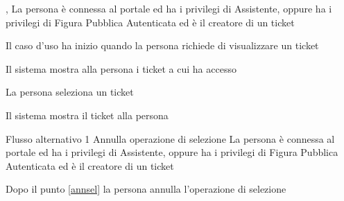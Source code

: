 \tabcuvspace

{, }
{La persona è connessa al portale ed ha i privilegi di Assistente, oppure ha i privilegi di Figura Pubblica Autenticata ed è il creatore di un ticket}
{\postNulle}
{\begin{enumCU}
	\item Il caso d'uso ha inizio quando la persona richiede di visualizzare un ticket
	\item Il sistema mostra alla persona i ticket a cui ha accesso\label{annsel}
	\item La persona seleziona un ticket
	\item Il sistema mostra il ticket alla persona
\end{enumCU}}
%	
{Flusso alternativo 1}%
{Annulla operazione di selezione}%
{La persona è connessa al portale ed ha i privilegi di Assistente, oppure ha i privilegi di Figura Pubblica Autenticata ed è il creatore di un ticket}%
{\postNulle}%
{\begin{enumCU}
		\item Dopo il punto \ref{annsel} la persona annulla l'operazione di selezione
\end{enumCU}}%


